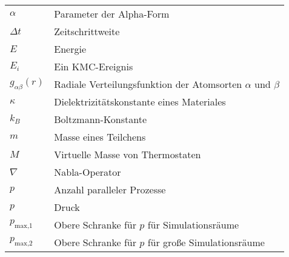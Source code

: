 \begin{longtable}{ll}
$\alpha$             & Parameter der Alpha-Form                                            \\
$\Delta t$           & Zeitschrittweite                                                    \\
$E$                  & Energie                                                             \\
$E_i$                & Ein KMC-Ereignis                                                    \\
$g_{\alpha\beta}(r)$ & Radiale Verteilungsfunktion der Atomsorten $\alpha$ und $\beta$     \\
$\kappa$             & Dielektrizitätskonstante eines Materiales                           \\
$k_B$                & Boltzmann-Konstante                                                 \\
$m$                  & Masse eines Teilchens                                               \\
$M$                  & Virtuelle Masse von Thermostaten                                    \\
$\nabla$             & Nabla-Operator                                                      \\
$p$                  & Anzahl paralleler Prozesse                                          \\
$p$                  & Druck                                                               \\
$p_\text{max,1}$     & Obere Schranke für $p$ für Simulationsräume                         \\
$p_\text{max,2}$     & Obere Schranke für $p$ für große Simulationsräume                   \\

\end{longtable}
